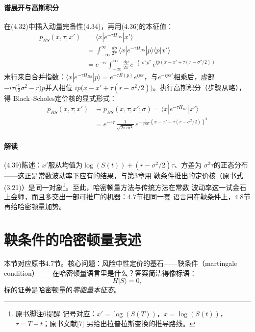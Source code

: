\paragraph{谱展开与高斯积分}
在(4.32)中插入动量完备性(4.34)，再用(4.36)的本征值：
\begin{align*}
p_{BS}(x,\tau;x')
&=\langle x|e^{-\tau H_{BS}}|x'\rangle\\
&=\int_{-\infty}^{\infty}\frac{dp}{2\pi}\,
\langle x|e^{-\tau H_{BS}}|p\rangle\langle p|x'\rangle
\tag{4.37}\\
&=e^{-r\tau}\int_{-\infty}^{\infty}\frac{dp}{2\pi}\,
e^{-\frac{1}{2}\tau\sigma^{2}p^{2}}\,
e^{ip\left(x-x'+\tau\left(r-\sigma^{2}/2\right)\right)}
\tag{4.38}
\end{align*}
末行来自合并指数：$\langle x|e^{-\tau H_{BS}}|p\rangle
=e^{-\tau E(p)}e^{ipx}$，与$e^{-ipx'}$相乘后，虚部
$-i\tau\bigl(\frac{1}{2}\sigma^{2}-r\bigr)p$并入相位
$ip\bigl(x-x'+\tau(r-\sigma^{2}/2)\bigr)$。执行高斯积分（步骤从略），得
Black--Scholes定价核的显式形式：
\begin{align*}
p_{BS}(x,\tau;x')&\equiv p_{BS}(x,\tau;x';\sigma)
=\langle x|e^{-\tau H_{BS}}|x'\rangle\\
&=e^{-r\tau}\,\frac{1}{\sqrt{2\pi\tau\sigma^{2}}}\,
e^{-\frac{1}{2\tau\sigma^{2}}
\left\{x-x'+\tau\left(r-\sigma^{2}/2\right)\right\}^{2}}
\tag{4.39}
\end{align*}

\paragraph{解读}
(4.39)陈述：$x'$服从均值为$\log(S(t))+(r-\sigma^{2}/2)\tau$、方差为
$\sigma^{2}\tau$的正态分布——这正是常数波动率下应有的结果，与第3章用
鞅条件推出的定价核（原书式(3.21)）是同一对象\footnote{原书脚注6提醒
记号对应：$x'=\log(S(T))$，$x=\log(S(t))$，$\tau=T-t$；原书文献[7]
另给出拉普拉斯变换的推导路线。}。至此，哈密顿量方法与传统方法在常数
波动率这一试金石上会师，而且多交出一部可推广的机器：4.7节把同一套
语言用在鞅条件上，4.8节再给哈密顿量加势。

\section{鞅条件的哈密顿量表述}

本节对应原书4.7节。核心问题：风险中性定价的基石——鞅条件（martingale
condition）——在哈密顿量语言里是什么？答案简洁得像标语：
\begin{equation*}
H|S\rangle=0,
\end{equation*}
标的证券是哈密顿量的\emph{零能量本征态}。

